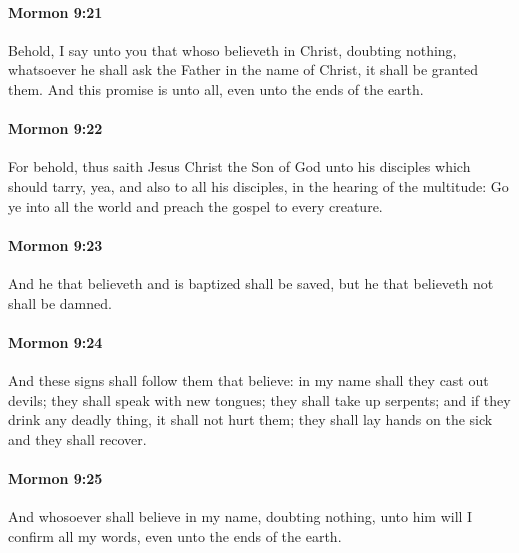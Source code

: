 		\paragraph{Mormon 9:21} %
			\label{MORMON-9-21}

			Behold, I say unto you
			that whoso believeth in Christ, doubting nothing,
			whatsoever he shall ask the Father in the name of Christ,
			it shall be granted them.
			And this promise is unto all, even unto the ends of the earth.

		\paragraph{Mormon 9:22} %
			\label{MORMON-9-22}

			For behold, thus saith Jesus Christ the Son of God
			unto his disciples which should tarry,
			yea, and also to all his disciples,
			in the hearing of the multitude:
			Go ye into all the world and preach the gospel to every creature.

		\paragraph{Mormon 9:23} %
			\label{MORMON-9-23}

			And he that believeth and is baptized shall be saved,
			but he that believeth not shall be damned.

		\paragraph{Mormon 9:24} %
			\label{MORMON-9-24}

			And these signs shall follow them that believe:
			in my name shall they cast out devils;
			they shall speak with new tongues;
			they shall take up serpents;
			and if they drink any deadly thing, it shall not hurt them;
			they shall lay hands on the sick and they shall recover.

		\paragraph{Mormon 9:25} %
			\label{MORMON-9-25}

			And whosoever shall believe in my name, doubting nothing,
			unto him will I confirm all my words, even unto the ends of the earth.

